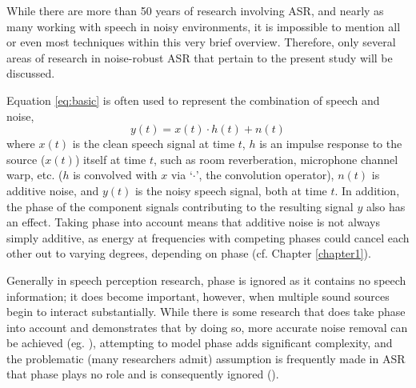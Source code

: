 While there are more than 50 years of research involving ASR, and nearly as many working with speech in noisy environments, it is impossible to mention all or even most techniques within this very brief overview.  Therefore, %
 only several areas of research in noise-robust ASR that pertain to the present study will be discussed.

Equation \ref{eq:basic} is often used to represent the combination of speech and noise,
\begin{equation}\label{eq:basic}
y(t) = x(t) \cdot h(t) + n(t)
\end{equation}
where $x(t)$ is the clean speech signal at time $t$, $h$ is an impulse response to the source ($x(t)$) itself at time $t$, such as room reverberation, microphone channel warp, etc. ($h$ is convolved with $x$ via `$\cdot$', the convolution operator), $n(t)$ is additive noise, and $y(t)$ is the noisy speech signal, both at time $t$.  In addition, the phase of the component signals contributing to the resulting signal $y$ also has an effect.  Taking phase into account means that additive noise is not always simply additive, as energy at frequencies with competing phases could cancel each other out to varying degrees, depending on phase (cf. Chapter \ref{chapter1}).  

Generally in speech perception research, phase is ignored as it contains no speech information; it does become important, however, when multiple sound sources begin to interact substantially. While there is some research that does take phase into account and demonstrates that by doing so, more accurate noise removal can be achieved (eg. \cite{deng:04,leutnant:09}), attempting to model phase adds significant complexity, and the problematic (many researchers admit) assumption is frequently made in ASR that phase plays no role and is consequently ignored (\cite{li:14}).  

